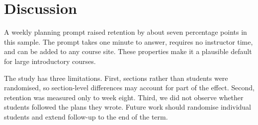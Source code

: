 \documentclass[11pt]{article}
\begin{document}
\section{Discussion}
A weekly planning prompt raised retention by about seven percentage points in this sample. The prompt takes one minute to answer, requires no instructor time, and can be added to any course site. These properties make it a plausible default for large introductory courses.

The study has three limitations. First, sections rather than students were randomised, so section-level differences may account for part of the effect. Second, retention was measured only to week eight. Third, we did not observe whether students followed the plans they wrote. Future work should randomise individual students and extend follow-up to the end of the term.



\end{document}
